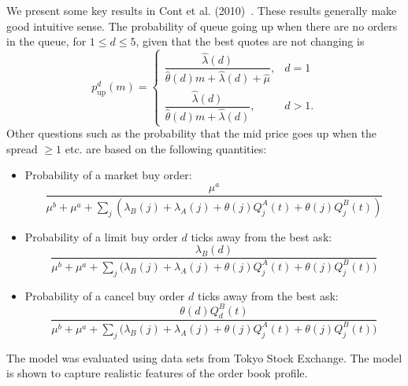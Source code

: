 We present some key results in Cont et al. (2010)~\cite{contstoi}. These results generally make good intuitive sense. The probability of queue going up when there are no orders in the queue, for $1 \leq d \leq 5$, given that the best quotes are not changing is
	\begin{equation}\label{eqn:queuecon}
	p_{\text{up}}^d(m)=
	\begin{cases}
	\dfrac{\hat{\lambda}(d)}{\hat{\theta}(d)m + \hat{\lambda}(d) + \hat{\mu}}, & d=1 \\
	\dfrac{\hat{\lambda}(d)}{\hat{\theta}(d)m + \hat{\lambda}(d)}, & d>1.
	\end{cases}
	\end{equation}
Other questions such as the probability that the mid price goes up when the spread $\geq 1$ etc. are based on the following quantities:
	\begin{itemize}
	\item Probability of a market buy order:
		\begin{equation}\label{eqn:probmarketbuy}
		\dfrac{\mu^a}{\mu^b+\mu^a+\sum_j (\lambda_B(j)+\lambda_A(j)+\theta(j) Q_j^A(t)+\theta(j)Q_j^B(t))}
		\end{equation}
	\item Probability of a limit buy order $d$ ticks away from the best ask:
		\begin{equation}\label{eqn:problimitbuytick}
		\dfrac{\lambda_B(d)}{\mu^b+\mu^a+\sum_j \big( \lambda_B(j)+\lambda_A(j)+\theta(j)Q_j^A(t)+\theta(j)Q_j^B(t) \big)}
		\end{equation}
	\item Probability of a cancel buy order $d$ ticks away from the best ask:
		\begin{equation}\label{eqn:probcanceltick}
		\dfrac{\theta(d)Q_d^B(t)}{\mu^b+\mu^a+\sum_j \big( \lambda_B(j)+\lambda_A(j)+\theta(j)Q_j^A(t)+\theta(j)Q_j^B(t) \big)}
		\end{equation}
	\end{itemize}
The model was evaluated using data sets from Tokyo Stock Exchange. The model is shown to capture realistic features of the order book profile.
